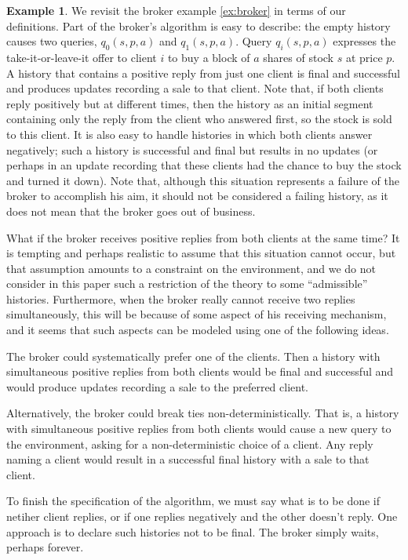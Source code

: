 \documentclass{LMCS}
\theoremstyle{definition}
\newtheorem{ex}[thm]{Example}
\begin{document}
\begin{ex}\label{ex;broker:re} We revisit the broker example
  \ref{ex:broker} in terms of our definitions.  Part of the broker's
  algorithm is easy to describe: the empty history causes two queries,
  $q_0(s,p,a)$ and $q_1(s,p,a)$.  Query $q_i(s,p,a)$ expresses the
  take-it-or-leave-it offer to client $i$ to buy a block
  of $a$ shares of stock $s$ at price $p$.  A history that contains a
  positive reply from just one client is final and successful and produces
  updates recording a sale to that client.  Note that, if both clients
  reply positively but at different times, then the history as an
  initial segment containing only the reply from the client who
  answered first, so the stock is sold to this client.  It is also
  easy to handle histories in which both clients answer negatively;
  such a history is successful and final but results in no updates (or
  perhaps in an update recording that these clients had the chance to
  buy the stock and turned it down).  Note that, although this
  situation represents a failure of the broker to accomplish his aim,
  it should not be considered a failing history, as it does not mean
  that the broker goes out of business.  

  What if the broker receives positive replies from both clients at
  the same time?  It is tempting and perhaps realistic to assume that
  this situation cannot occur, but that assumption amounts to a
  constraint on the environment, and we do not consider in this paper
  such a restriction of the theory to some ``admissible'' histories.
  Furthermore, when the broker really cannot receive two replies
  simultaneously, this will be because of some aspect of his receiving
  mechanism, and it seems that such aspects can be modeled using one of
  the following ideas.

  The broker could systematically prefer one of the clients.  Then a
  history with simultaneous positive replies from both clients would
  be final and successful and would produce updates recording a sale
  to the preferred client.

Alternatively, the broker could break ties non-deterministically.
That is, a history with simultaneous positive replies from both
clients would cause a new query to the environment, asking for a
non-deterministic choice of a client.  Any reply naming a client
would result in a successful final history with a sale to that
client.  

To finish the specification of the algorithm, we must say what is to
be done if netiher client replies, or if one replies negatively and
the other doesn't reply.  One approach is to declare such histories
not to be final.  The broker simply waits, perhaps forever.  


\end{ex}
\end{document}

